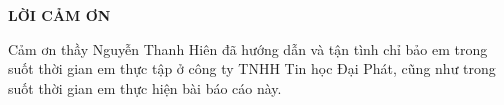 \newpage
\changefontsizes{16pt}
\centerline{\textbf{LỜI CẢM ƠN}}

\changefontsizes{13pt}
\bigskip
\setlength{\parindent}{0cm}

Cảm ơn thầy Nguyễn Thanh Hiên đã hướng dẫn và tận tình chỉ bảo em trong suốt thời gian em thực tập ở công ty TNHH Tin học Đại Phát, cũng như trong suốt thời gian em thực hiện bài báo cáo này.
    